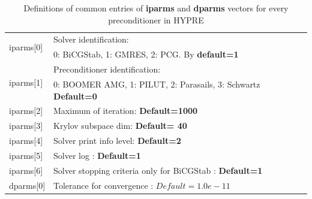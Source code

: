 \documentclass[a4paper,twoside,12pt]{book}
\begin{document}
\begin{table}[hbtp]
 \begin{tabular}{|l|l|} \hline
\multirow{2}{*}{iparms[0]} &  Solver identification:  \\
& 0: BiCGStab, 1: GMRES, 2: PCG. By \textbf{default=1}\\ \hline
\multirow{2}{*}{iparms[1]} &  Preconditioner identification: \\
& 0: BOOMER AMG, 1: PILUT, 2: Parasails, 3: Schwartz \textbf{Default=0}\\ \hline
iparms[2] &  Maximum of iteration: \textbf{Default=1000}   \\ \hline
iparms[3] &  Krylov subspace dim: \textbf{Default= 40}  \\ \hline
iparms[4] & Solver print info level: \textbf{Default=2}  \\ \hline
iparms[5] &  Solver log : \textbf{Default=1}   \\  \hline
iparms[6] &  Solver stopping criteria only for BiCGStab : \textbf{Default=1}
\\  \hline
dparms[0] &  Tolerance for convergence : \textbf{$Default=1.0e-11$}   \\  \hline
 \end{tabular}
\caption{Definitions of common entries of \textbf{iparms} and \textbf{dparms}
vectors for every preconditioner in HYPRE}
\label{communipramsHypre}
\end{table}
\end{document}
